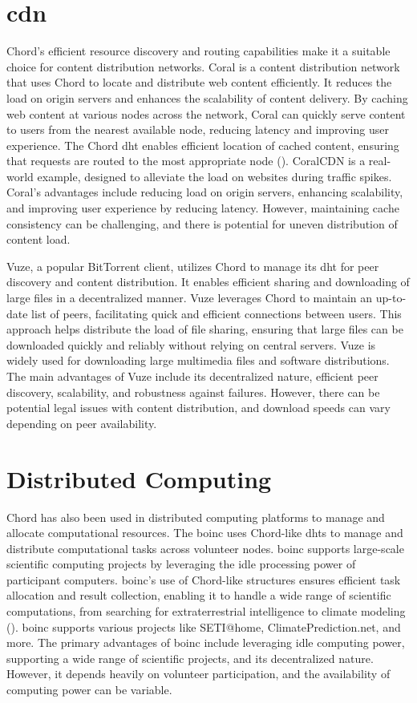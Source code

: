 \section{\acrlong{cdn}}
Chord's efficient resource discovery and routing capabilities make it a suitable choice for content distribution networks.
Coral is a content distribution network that uses Chord to locate and distribute web content efficiently.
It reduces the load on origin servers and enhances the scalability of content delivery.
By caching web content at various nodes across the network, Coral can quickly serve content to users from the nearest available node, reducing latency and improving user experience.
The Chord \gls{dht} enables efficient location of cached content, ensuring that requests are routed to the most appropriate node (\cite{CoralCDN2010}).
CoralCDN is a real-world example, designed to alleviate the load on websites during traffic spikes.
Coral's advantages include reducing load on origin servers, enhancing scalability, and improving user experience by reducing latency.
However, maintaining cache consistency can be challenging, and there is potential for uneven distribution of content load.

Vuze, a popular BitTorrent client, utilizes Chord to manage its \gls{dht} for peer discovery and content distribution.
It enables efficient sharing and downloading of large files in a decentralized manner.
Vuze leverages Chord to maintain an up-to-date list of peers, facilitating quick and efficient connections between users.
This approach helps distribute the load of file sharing, ensuring that large files can be downloaded quickly and reliably without relying on central servers.
Vuze is widely used for downloading large multimedia files and software distributions.
The main advantages of Vuze include its decentralized nature, efficient peer discovery, scalability, and robustness against failures.
However, there can be potential legal issues with content distribution, and download speeds can vary depending on peer availability.

\section{Distributed Computing}
Chord has also been used in distributed computing platforms to manage and allocate computational resources.
The \gls{boinc} uses Chord-like \glspl{dht} to manage and distribute computational tasks across volunteer nodes.
\gls{boinc} supports large-scale scientific computing projects by leveraging the idle processing power of participant computers.
\gls{boinc}'s use of Chord-like structures ensures efficient task allocation and result collection, enabling it to handle a wide range of scientific computations, from searching for extraterrestrial intelligence to climate modeling (\cite{BOINC2004}).
\gls{boinc} supports various projects like SETI@home, ClimatePrediction.net, and more.
The primary advantages of \gls{boinc} include leveraging idle computing power, supporting a wide range of scientific projects, and its decentralized nature.
However, it depends heavily on volunteer participation, and the availability of computing power can be variable.

